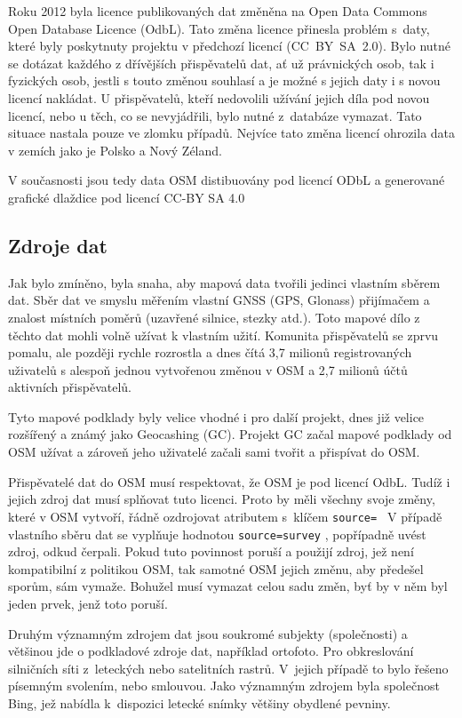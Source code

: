 Roku 2012 byla licence publikovaných dat změněna na Open Data Commons
Open Database Licence (OdbL).
Tato změna licence přinesla problém
s~daty, které byly poskytnuty projektu v předchozí licencí
(CC~BY~SA~2.0). Bylo nutné se dotázat každého z dřívějších
přispěvatelů dat, ať už právnických osob, tak i fyzických osob, jestli
s touto změnou souhlasí a je možné s jejich daty i s novou licencí
nakládat. U přispěvatelů, kteří nedovolili užívání jejich díla
pod novou licencí, nebo u těch, co se nevyjádřili, bylo nutné
z~databáze vymazat. Tato situace nastala pouze ve zlomku případů.
Nejvíce tato změna licencí ohrozila data v zemích jako je Polsko a Nový Zéland.

V současnosti jsou tedy data OSM distibuovány pod licencí ODbL a
generované grafické dlaždice pod licencí CC-BY SA 4.0
\cite {OSMlicenceIssue}


\subsection{Zdroje dat}
\label{Zdroje dat}

Jak bylo zmíněno, byla snaha, aby mapová data tvořili jedinci vlastním
sběrem dat. Sběr dat ve smyslu měřením vlastní GNSS (GPS, Glonass)
přijímačem a znalost místních poměrů (uzavřené silnice, stezky atd.).
Toto mapové dílo z těchto dat mohli volně užívat k vlastním užití.
Komunita přispěvatelů se zprvu pomalu, ale později rychle rozrostla a
dnes čítá 3,7 milionů registrovaných uživatelů s alespoň jednou
vytvořenou změnou v OSM a 2,7 milionů účtů aktivních přispěvatelů.\cite{OSMstats}

Tyto mapové podklady byly velice vhodné i pro další projekt, dnes již
velice rozšířený a známý jako Geocashing (GC). Projekt GC začal mapové
podklady od OSM užívat a zároveň jeho uživatelé začali sami tvořit a
přispívat do OSM. 

Přispěvatelé dat do OSM musí respektovat, že OSM je pod licencí OdbL.
Tudíž i jejich zdroj dat musí splňovat tuto licenci. Proto by měli
všechny svoje změny, které v OSM vytvoří, řádně ozdrojovat atributem
s~klíčem 
{\tt source= }
V případě vlastního sběru dat se vyplňuje hodnotou
{\tt source=survey} ,
popřípadně uvést zdroj, odkud čerpali. Pokud tuto povinnost poruší a
použijí zdroj, jež není kompatibilní z politikou OSM, tak samotné OSM
jejich změnu, aby předešel sporům, sám vymaže. Bohužel musí vymazat
celou sadu změn, byť by v něm byl jeden prvek, jenž toto poruší.

Druhým významným zdrojem dat jsou soukromé subjekty (společnosti) a
většinou jde o podkladové zdroje dat, například ortofoto. Pro obkreslování
silničních síti z~leteckých nebo satelitních rastrů. V~jejich případě to
bylo řešeno písemným svolením, nebo smlouvou. Jako významným zdrojem byla
společnost Bing, jež nabídla k~dispozici letecké snímky většiny
obydlené pevniny. 

